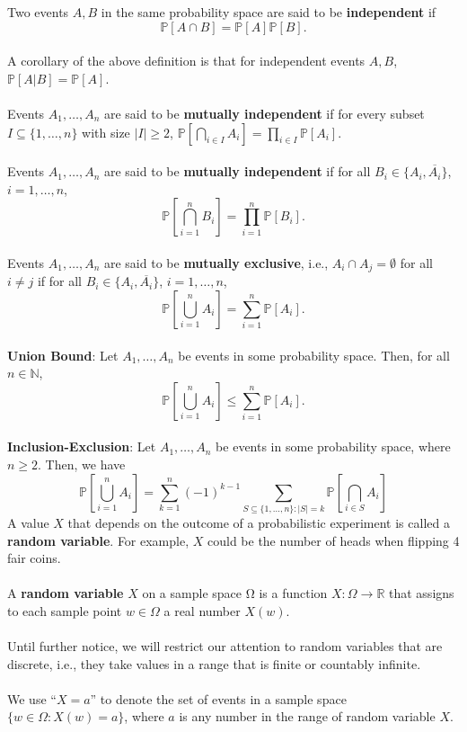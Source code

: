 \documentclass{article}
\theoremstyle{definition}
\begin{document}
Two events $A, B$ in the same probability space are said to be \textbf{independent} if $$\mathbb{P}[A \cap B] = \mathbb{P}[A] \mathbb{P}[B].$$ \\
A corollary of the above definition is that for independent events $A, B$, $\mathbb{P}[A | B] = \mathbb{P}[A]$. \\ \\
Events $A_1, \dots, A_n$ are said to be \textbf{mutually independent} if for every subset $I \subseteq \{1, \dots, n\}$ with size $|I| \geq 2$, $\mathbb{P}[\bigcap_{i \in I} A_i] = \prod_{i \in I}\mathbb{P}[A_i].$ \\ \\
Events $A_1, \dots, A_n$ are said to be \textbf{mutually independent} if for all $B_i \in \{A_i, \overline{A_i}\}$, $i = 1, \dots, n$, $$\mathbb{P}[\bigcap_{i = 1}^n B_i] = \prod_{i = 1}^n \mathbb{P}[B_i].$$ \\
Events $A_1, \dots, A_n$ are said to be \textbf{mutually exclusive}, i.e., $A_i \cap A_j = \emptyset$ for all $i \neq j$ if for all $B_i \in \{A_i, \overline{A_i}\}$, $i = 1, \dots, n$, $$\mathbb{P}[\bigcup_{i = 1}^n A_i] = \sum_{i = 1}^n \mathbb{P}[A_i].$$ \\
\textbf{Union Bound}: Let $A_1, \dots, A_n$ be events in some probability space. Then, for all $n \in \mathbb{N}$, $$\mathbb{P}[\bigcup_{i = 1}^n A_i] \leq \sum_{i = 1}^n \mathbb{P}[A_i].$$ \\
\textbf{Inclusion-Exclusion}: Let $A_1, \dots, A_n$ be events in some probability space, where $n \geq 2$. Then, we have $$\mathbb{P}[\bigcup_{i = 1}^n A_i] = \sum_{k = 1}^n (-1)^{k - 1} \sum_{S \subseteq \{1, \dots, n\}: |S| = k} \mathbb{P}[\bigcap_{i \in S} A_i]$$
A value $X$ that depends on the outcome of a probabilistic experiment is called a \textbf{random variable}. For example, $X$ could be the number of heads when flipping 4 fair coins. \\ \\
A \textbf{random variable} $X$ on a sample space Ω is a function $X : \Omega \rightarrow \mathbb{R}$ that assigns to each sample point $w \in \Omega$ a real number $X(w)$. \\ \\
Until further notice, we will restrict our attention to random variables that are discrete, i.e., they take values in a range that is finite or countably infinite. \\ \\
We use ``$X = a$'' to denote the set of events in a sample space $\{w \in \Omega : X(w) = a\}$, where $a$ is any number in the range of random variable $X$. \\ \\
\end{document}
